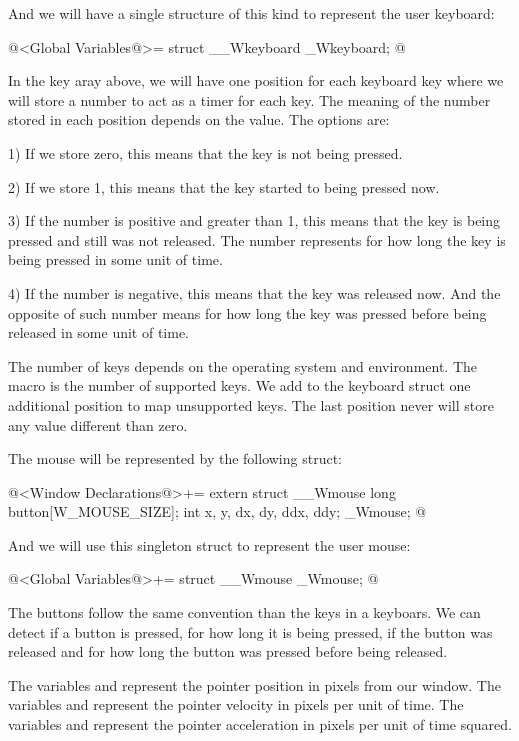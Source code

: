 And we will have a single structure of this kind to represent the user
keyboard:

\iniciocodigo
@<Global Variables@>=
struct __Wkeyboard _Wkeyboard;
@
\fimcodigo


In the key aray above, we will have one position for each keyboard key
where we will store a number to act as a timer for each key. The
meaning of the number stored in each position depends on the
value. The options are:

1) If we store zero, this means that the key is not being pressed.

2) If we store 1, this means that the key started to being pressed now.

3) If the number is positive and greater than 1, this means that the
key is being pressed and still was not released. The number represents
for how long the key is being pressed in some unit of time.

4) If the number is negative, this means that the key was released
now. And the opposite of such number means for how long the key was
pressed before being released in some unit of time.

The number of keys depends on the operating system and
environment. The macro  is the number of
supported keys. We add to the keyboard struct one additional position
to map unsupported keys. The last position never will store any value
different than zero.

The mouse will be represented by the following struct:

\iniciocodigo
@<Window Declarations@>+=
extern struct __Wmouse{
  long button[W_MOUSE_SIZE];
  int x, y, dx, dy, ddx, ddy;
} _Wmouse;
@
\fimcodigo

And we will use this singleton struct to represent the user mouse:

\iniciocodigo
@<Global Variables@>+=
struct __Wmouse _Wmouse;
@
\fimcodigo

The buttons follow the same convention than the keys in a keyboars. We
can detect if a button is pressed, for how long it is being pressed,
if the button was released and for how long the button was pressed
before being released.

The variables  and  represent the pointer
position in pixels from our window. The variables 
and  represent the pointer velocity in pixels per unit of
time. The variables  and  represent
the pointer acceleration in pixels per unit of time squared.

